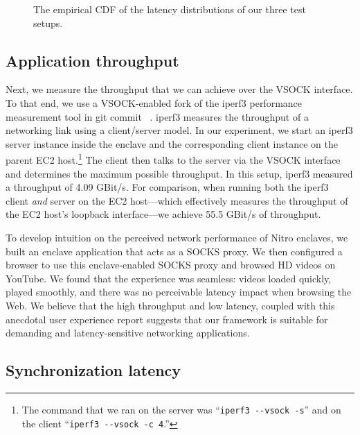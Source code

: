 \begin{figure}[t]
    \centering
    
    \label{fig:latency-cdf}
    \caption{The empirical CDF of the latency distributions of our three test
      setups.}
\end{figure}

\subsection{Application throughput}
\label{sec:throughput}

Next, we measure the throughput that we can achieve over the VSOCK interface.
To that end, we use a VSOCK-enabled fork of the iperf3 performance measurement
tool in git commit ~\cite{iperf-vsock}.  iperf3 measures the throughput of a networking link
using a client/server model.  In our experiment, we start an iperf3 server
instance inside the enclave and the corresponding client instance on the parent
EC2 host.\footnote{The command that we ran on the server was
``\texttt{iperf3 -{}-vsock -s}'' and on the client ``\texttt{iperf3 -{}-vsock -c
4}.''} The client then talks to the server via the VSOCK interface and
determines the maximum possible throughput.  In this setup, iperf3 measured a
throughput of 4.09 GBit/s.  For comparison, when running both the iperf3 client
\emph{and} server on the EC2 host---which effectively measures the
throughput of the EC2 host's loopback interface---we achieve 55.5 GBit/s of
throughput.

To develop intuition on the perceived network performance of Nitro enclaves, we
built an enclave application that acts as a SOCKS proxy.  We then configured a
browser to use this enclave-enabled SOCKS proxy and browsed HD videos on
YouTube.  We found that the experience was seamless: videos loaded quickly,
played smoothly, and there was no perceivable latency impact when browsing the
Web.  We believe that the high throughput and low latency, coupled with this
anecdotal user experience report suggests that our framework is suitable for
demanding and latency-sensitive networking applications.

%
%
%
%
%
%

\subsection{Synchronization latency}
\label{sec:synclatency}

